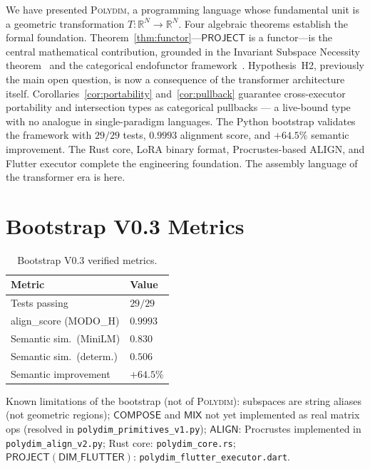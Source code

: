 \documentclass[10pt,twocolumn]{article}
\theoremstyle{plain}
\theoremstyle{definition}
\theoremstyle{remark}
\newcommand{\RR}{\mathbb{R}}
\newcommand{\Compose}{\mathsf{COMPOSE}}
\newcommand{\Mix}{\mathsf{MIX}}
\newcommand{\Project}{\mathsf{PROJECT}}
\newcommand{\Align}{\mathsf{ALIGN}}
\begin{document}
We have presented \textsc{Polydim}, a programming language whose fundamental
unit is a geometric transformation $T\colon\RR^N\to\RR^N$. Four algebraic
theorems establish the formal foundation.
Theorem~\ref{thm:functor}---$\Project$ is a functor---is the central
mathematical contribution, grounded in the Invariant Subspace Necessity
theorem~\citep{suarez2026invariant} and the categorical endofunctor
framework~\citep{oneill2025endofunctor}. Hypothesis~H2, previously the
main open question, is now a consequence of the transformer architecture
itself. Corollaries~\ref{cor:portability} and~\ref{cor:pullback} guarantee
cross-executor portability and intersection types as categorical pullbacks ---
a live-bound type with no analogue in single-paradigm languages. The Python
bootstrap validates the framework with $29/29$ tests, $0.9993$ alignment score,
and $+64.5\%$ semantic improvement. The Rust core, LoRA binary format,
Procrustes-based ALIGN, and Flutter executor complete the engineering foundation.
The assembly language of the transformer era is here.




\appendix
\section{Bootstrap V0.3 Metrics}

\begin{table}[h]
\centering
\small
\begin{tabular}{ll}
\toprule
Metric & Value \\
\midrule
Tests passing            & $29/29$ \\
align\_score (MODO\_H)   & $0.9993$ \\
Semantic sim.\ (MiniLM)  & $0.830$ \\
Semantic sim.\ (determ.) & $0.506$ \\
Semantic improvement     & $+64.5\%$ \\
\bottomrule
\end{tabular}
\caption{Bootstrap V0.3 verified metrics.}
\end{table}

\noindent Known limitations of the bootstrap (not of \textsc{Polydim}):
subspaces are string aliases (not geometric regions);
$\Compose$ and $\Mix$ not yet implemented as real matrix ops (resolved in
\texttt{polydim\_primitives\_v1.py});
$\Align$: Procrustes implemented in \texttt{polydim\_align\_v2.py};
Rust core: \texttt{polydim\_core.rs};
$\Project(\mathsf{DIM\_FLUTTER})$: \texttt{polydim\_flutter\_executor.dart}.
\end{document}
